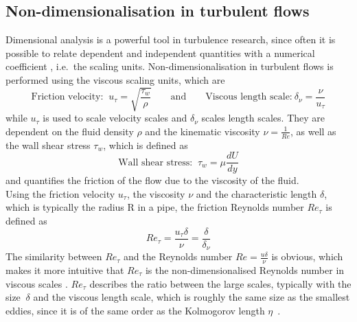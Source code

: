 \subsection{Non-dimensionalisation in turbulent flows}\label{subsec: Nondimensionalisation of turbulent flows}
Dimensional analysis is a powerful tool in turbulence research, since often it is possible to relate dependent and independent quantities with a numerical coefficient \citep{tennekesFirstCourseTurbulence1972}, i.e.\ the scaling units.
Non-dimensionalisation in turbulent flows is performed using the viscous scaling units, which are
\begin{equation}\label{eq: viscous scaling units}
    \text{Friction velocity: }\ u_\tau = \sqrt{\frac{\tau_w}{\rho}} \qquad \text{and} \qquad \text{Viscous length scale:}\ \delta_\nu = \frac{\nu}{u_\tau}
\end{equation}
while $u_\tau$ is used to scale velocity scales and $\delta_\nu$ scales length scales.
They are dependent on the fluid density $\rho$ and the kinematic viscosity $\nu = \frac{1}{Re}$, as well as the wall shear stress $\tau_w$, which is defined as
\begin{equation}\label{eq: wall shear stress}
   \text{Wall shear stress: } \ \tau_w = \mu \frac{d U}{dy}
\end{equation}
and quantifies the friction of the flow due to the viscosity of the fluid.\\
Using the friction velocity $u_\tau$, the viscosity $\nu$ and the characteristic length $\delta$, which is typically the radius R in a pipe, the friction Reynolds number $Re_\tau$ is defined as
\begin{equation}\label{eq: friction reynolds number}
   Re_\tau = \frac{u_\tau \delta}{\nu} = \frac{\delta}{\delta_\nu}
\end{equation}
The similarity between $Re_\tau$ and the Reynolds number $Re = \frac{u \delta}{\nu}$ is obvious, which makes it more intuitive that $Re_\tau$ is the non-dimensionalised Reynolds number in viscous scales \citep{popeTurbulentFlows2015}. 
$Re_\tau$ describes the ratio between the large scales, typically with the size $~\delta$ and the viscous length scale, which is roughly the same size as the smallest eddies, since it is of the same order as the Kolmogorov length $\eta$~\citep{marusicWallboundedTurbulentFlows2010, jimenezNearwallTurbulence2013}.\\
